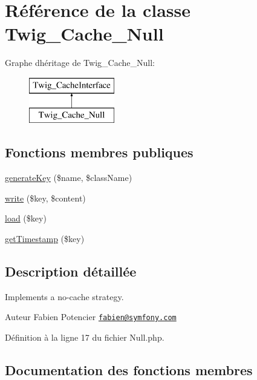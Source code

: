 \hypertarget{class_twig___cache___null}{}\section{Référence de la classe Twig\+\_\+\+Cache\+\_\+\+Null}
\label{class_twig___cache___null}
Graphe d\textquotesingle{}héritage de Twig\+\_\+\+Cache\+\_\+\+Null\+:\begin{figure}[H]
\begin{center}
\leavevmode
\includegraphics[height=2.000000cm]{class_twig___cache___null}
\end{center}
\end{figure}
\subsection*{Fonctions membres publiques}
\begin{DoxyCompactItemize}
\item 
\hyperlink{class_twig___cache___null_aa552341b7edde6c210aef20fdd86986e}{generate\+Key} (\$name, \$class\+Name)
\item 
\hyperlink{class_twig___cache___null_abdff0953b972adfc563b2e2573d4920b}{write} (\$key, \$content)
\item 
\hyperlink{class_twig___cache___null_a8d0a51036af71436a1e8dcc26fc4281d}{load} (\$key)
\item 
\hyperlink{class_twig___cache___null_aff0cbcd61bb5f05632e20fd0baf65714}{get\+Timestamp} (\$key)
\end{DoxyCompactItemize}


\subsection{Description détaillée}
Implements a no-\/cache strategy.

\begin{DoxyAuthor}{Auteur}
Fabien Potencier \href{mailto:fabien@symfony.com}{\tt fabien@symfony.\+com} 
\end{DoxyAuthor}


Définition à la ligne 17 du fichier Null.\+php.



\subsection{Documentation des fonctions membres}
